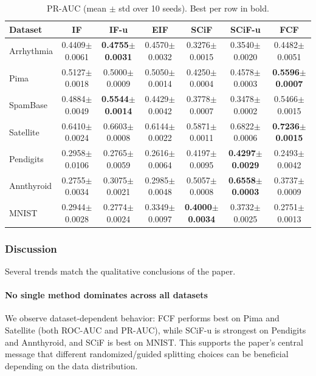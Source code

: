 \begin{table}[t]
\centering
\caption{PR-AUC (mean $\pm$ std over 10 seeds). Best per row in bold.}
\label{tab:pr-results}
\scriptsize
\setlength{\tabcolsep}{4.5pt}
\renewcommand{\arraystretch}{1.15}
\begin{tabular}{lcccccc}
\toprule
Dataset & IF & IF-u & EIF & SCiF & SCiF-u & FCF \\
\midrule
Arrhythmia &
0.4409$\pm$0.0061 &
\textbf{0.4755$\pm$0.0031} &
0.4570$\pm$0.0032 &
0.3276$\pm$0.0015 &
0.3540$\pm$0.0020 &
0.4482$\pm$0.0051 \\
Pima &
0.5127$\pm$0.0018 &
0.5000$\pm$0.0009 &
0.5050$\pm$0.0014 &
0.4250$\pm$0.0004 &
0.4578$\pm$0.0003 &
\textbf{0.5596$\pm$0.0007} \\
SpamBase &
0.4884$\pm$0.0049 &
\textbf{0.5544$\pm$0.0014} &
0.4429$\pm$0.0042 &
0.3778$\pm$0.0007 &
0.3478$\pm$0.0002 &
0.5466$\pm$0.0015 \\
Satellite &
0.6410$\pm$0.0024 &
0.6603$\pm$0.0008 &
0.6144$\pm$0.0022 &
0.5871$\pm$0.0011 &
0.6822$\pm$0.0006 &
\textbf{0.7236$\pm$0.0015} \\
Pendigits &
0.2958$\pm$0.0106 &
0.2765$\pm$0.0059 &
0.2616$\pm$0.0064 &
0.4197$\pm$0.0095 &
\textbf{0.4297$\pm$0.0029} &
0.2493$\pm$0.0042 \\
Annthyroid &
0.2755$\pm$0.0034 &
0.3075$\pm$0.0021 &
0.2985$\pm$0.0048 &
0.5057$\pm$0.0008 &
\textbf{0.6558$\pm$0.0003} &
0.3737$\pm$0.0009 \\
MNIST &
0.2944$\pm$0.0028 &
0.2774$\pm$0.0024 &
0.3349$\pm$0.0097 &
\textbf{0.4000$\pm$0.0034} &
0.3732$\pm$0.0025 &
0.2751$\pm$0.0013 \\
\bottomrule
\end{tabular}
\end{table}

\subsubsection{Discussion}
Several trends match the qualitative conclusions of the paper.

\paragraph{No single method dominates across all datasets}
We observe dataset-dependent behavior: FCF performs best on Pima and Satellite (both ROC-AUC and PR-AUC), while SCiF-u is strongest on Pendigits and Annthyroid, and SCiF is best on MNIST. This supports the paper's central message that different randomized/guided splitting choices can be beneficial depending on the data distribution.


